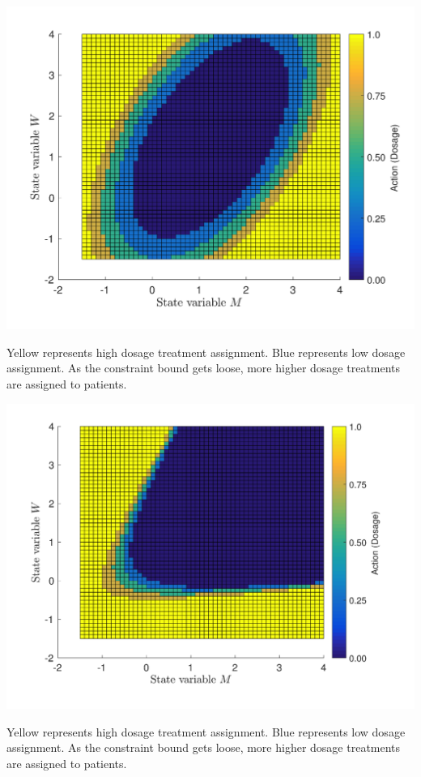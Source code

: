 \documentclass{article}
\begin{document}
	\begin{minipage}{0.95\linewidth}
		\includegraphics[width=\linewidth]{./figs/action_nu5.png}
		\caption*{Yellow represents high dosage treatment assignment. Blue represents low dosage assignment. As the constraint bound gets loose, more higher dosage treatments are assigned to patients.}
	\end{minipage}
	\newpage
	\begin{minipage}{0.95\linewidth}
		\includegraphics[width=\linewidth]{./figs/action_nu10.png}
		\caption*{Yellow represents high dosage treatment assignment. Blue represents low dosage assignment. As the constraint bound gets loose, more higher dosage treatments are assigned to patients.}
	\end{minipage}
\end{document}
